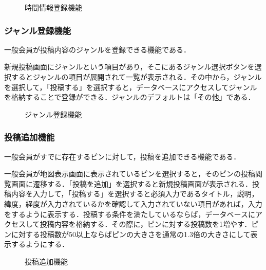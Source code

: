 \begin{figure}[H]
    \centering
    
    \caption{時間情報登録機能}
    \label{fig:pinpost_gen3}
\end{figure}

\subsubsection{ジャンル登録機能}
一般会員が投稿内容のジャンルを登録できる機能である．

新規投稿画面にジャンルという項目があり，そこにあるジャンル選択ボタンを選択するとジャンルの項目が展開されて一覧が表示される．その中から，ジャンルを選択して，「投稿する」を選択すると，データベースにアクセスしてジャンルを格納することで登録ができる．ジャンルのデフォルトは「その他」である．

\begin{figure}[H]
    \centering
    
    \caption{ジャンル登録機能}
    \label{fig:pinpost_gen4}
\end{figure}

\subsubsection{投稿追加機能}
一般会員がすでに存在するピンに対して，投稿を追加できる機能である．

一般会員が地図表示画面に表示されているピンを選択すると，そのピンの投稿閲覧画面に遷移する．「投稿を追加」を選択すると新規投稿画面が表示される．投稿内容を入力して，「投稿する」を選択すると必須入力であるタイトル，説明，緯度，経度が入力されているかを確認して入力されていない項目があれば，入力をするように表示する．投稿する条件を満たしているならば，データベースにアクセスして投稿内容を格納する．その際に，ピンに対する投稿数を1増やす．ピンに対する投稿数が50以上ならばピンの大きさを通常の1.3倍の大きさにして表示するようにする．

\begin{figure}[H]
    \centering
    
    \caption{投稿追加機能}
    \label{fig:pinpost_gen5}
\end{figure}